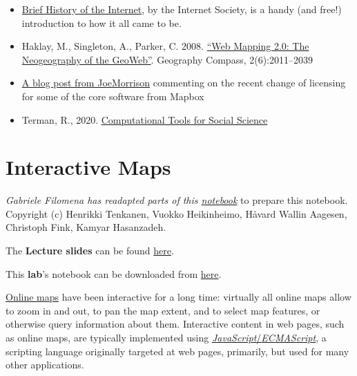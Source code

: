 \documentclass[
  letterpaper,
  DIV=11,
  numbers=noendperiod]{scrreprt}
\providecommand{\tightlist}{%
  \setlength{\itemsep}{0pt}\setlength{\parskip}{0pt}}\usepackage{longtable,booktabs,array}
\begin{document}
\begin{itemize}
\tightlist
\item
  \href{https://www.internetsociety.org/resources/doc/2017/brief-history-internet/}{Brief
  History of the Internet}, by the Internet Society, is a handy (and
  free!) introduction to how it all came to be.
\item
  Haklay, M., Singleton, A., Parker, C. 2008.
  \href{https://compass.onlinelibrary.wiley.com/doi/abs/10.1111/j.1749-8198.2008.00167.x}{``Web
  Mapping 2.0: The Neogeography of the GeoWeb''}. Geography Compass,
  2(6):2011--2039
\item
  \href{https://joemorrison.medium.com/death-of-an-open-source-business-model-62bc227a7e9b}{A
  blog post from JoeMorrison} commenting on the recent change of
  licensing for some of the core software from Mapbox
\item
  Terman, R., 2020.
  \href{https://plsc-31101.github.io/course/}{Computational Tools for
  Social Science}
\end{itemize}


\hypertarget{interactive-maps}{%
\chapter{Interactive Maps}\label{interactive-maps}}

\emph{Gabriele Filomena has readapted parts of this
\href{https://autogis-site.readthedocs.io/en/latest/lessons/lesson-5/interactive-maps.html}{notebook}}
to prepare this notebook. Copyright (c) Henrikki Tenkanen, Vuokko
Heikinheimo, Håvard Wallin Aagesen, Christoph Fink, Kamyar Hasanzadeh.

The \textbf{Lecture slides} can be found
\href{https://github.com/GDSL-UL/wma/raw/main/lectures/w04.pdf}{here}.

This \textbf{lab}'s notebook can be downloaded from
\href{https://github.com/GDSL-UL/wma/blob/main/labs/w04_interactive.ipynb}{here}.

\href{https://link.springer.com/referenceworkentry/10.1007/978-3-319-23519-6_1485-2}{Online
maps} have been interactive for a long time: virtually all online maps
allow to zoom in and out, to pan the map extent, and to select map
features, or otherwise query information about them. Interactive content
in web pages, such as online maps, are typically implemented using
\href{https://en.wikipedia.org/wiki/ECMAScript}{\emph{JavaScript}/\emph{ECMAScript}},
a scripting language originally targeted at web pages, primarily, but
used for many other applications.
\end{document}
